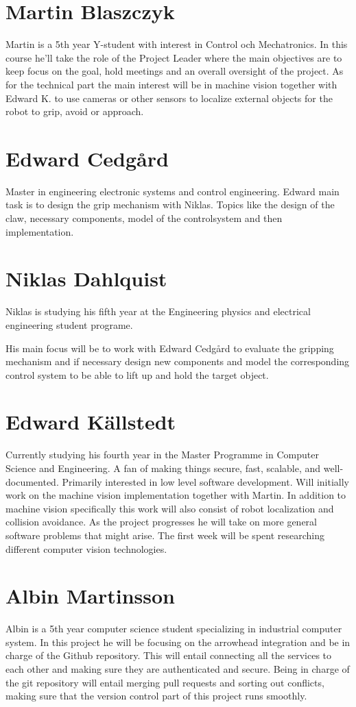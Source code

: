 \section*{Martin Blaszczyk}
Martin is a 5th year Y-student with interest in Control och Mechatronics. 
In this course he'll take the role of the Project Leader where the main objectives
are to keep focus on the goal, hold meetings and an overall oversight of the project. 
As for the technical part the main interest will be in machine vision together with
Edward K. to use cameras or other sensors to localize external objects for the 
robot to grip, avoid or approach. 

\section*{Edward Cedgård}
Master in engineering electronic systems and control engineering.
Edward main task is to design the grip mechanism with Niklas. Topics like
the design of the claw, necessary components, model of the controlsystem and then implementation. 

\section*{Niklas Dahlquist}
Niklas is studying his fifth year at the Engineering physics and electrical engineering student programe.

His main focus will be to work with Edward Cedgård to evaluate the gripping mechanism and if necessary design new components and model the corresponding control system to be able to lift up and hold the target object.
\newpage
\section*{Edward Källstedt}
Currently studying his fourth year in the Master Programme in Computer Science and Engineering.
A fan of making things secure, fast, scalable, and well-documented. Primarily interested in
low level software development. Will initially work on the machine vision implementation 
together with Martin. In addition to machine vision specifically this work will also consist
of robot localization and collision avoidance. As the project progresses he will take on more
general software problems that might arise. The first week will be spent researching different
computer vision technologies.

\section*{Albin Martinsson}
Albin is a 5th year computer science student specializing in industrial computer system. In this project he will be focusing on the 
arrowhead integration and be in charge of the Github repository. This will entail connecting all the services to each other and
making sure they are authenticated and secure. Being in charge of the git repository will entail merging pull requests and sorting
out conflicts, making sure that the version control part of this project runs smoothly.

